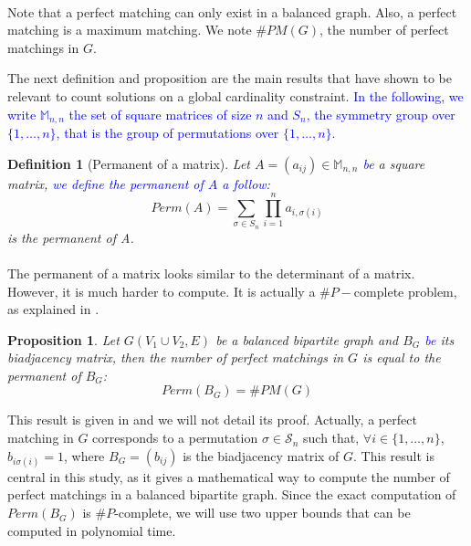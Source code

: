 \documentclass[jair,twoside,11pt,theapa]{article}
\newtheorem{proposition}[theorem]{Proposition}
\newtheorem{definition}[theorem]{Definition}
\newcommand{\minor}[1]{\textcolor{blue}{#1}}
\newcommand{\perm}[1]{Perm(#1)}
\newcommand{\nbperfectmatching}[1]{\#PM(#1)}
\begin{document}
\paragraph{}
Note that a perfect matching can only exist in a balanced graph. Also, a perfect matching is a maximum matching. We note $\#PM(G)$, the number of perfect matchings in $G$.

The next definition and proposition are the main results that \cite{PesantQZ12} have shown to be relevant to count solutions on a global cardinality constraint. \minor{In the following, we write $\mathbb{M}_{n,n}$ the set of square matrices of size $n$ and $S_n$, the symmetry group over $\lbrace 1, \ldots, n \rbrace$, that is the group of permutations over $\lbrace 1, \ldots, n \rbrace$}.

\begin{definition}[Permanent of a matrix%
]
	Let $A=(a_{ij}) \in \mathbb{M}_{n,n}$ \minor{be} a square matrix, \minor{we define the permanent of $A$ a follow:}
	\begin{equation}
		\perm{A} = \underset{\sigma \in S_n}{\sum}\prod_{i=1}^n a_{i,\sigma(i)}
	\end{equation}
	is the permanent of A.
\end{definition}

\paragraph{}
The permanent of a matrix looks similar to the determinant of a matrix. However, it is much harder to compute. It is actually a $\#P-$complete problem, as explained in \cite{Valiant79}.

\begin{proposition}%
	Let $G(V_1 \cup V_2, E)$ be a balanced bipartite graph and $B_G$ \minor{be} its biadjacency matrix, then the number of perfect matchings in $G$ is equal to the permanent of $B_G$:
	\begin{equation}
		\perm{B_G}=\nbperfectmatching{G}
	\end{equation}
\end{proposition}
This result is given in \cite{MT09} and we will not detail its proof. Actually, a perfect matching in $G$ corresponds to a permutation $\sigma \in \mathcal{S}_n$ such that, $\forall i \in \lbrace 1, \ldots, n \rbrace$, $b_{i\sigma(i)} = 1$, where $B_G = (b_{ij})$ is the biadjacency matrix of $G$. This result is central in this study, as it gives a mathematical way to compute the number of perfect matchings in a balanced bipartite graph. Since the exact computation of $\perm{B_G}$ is $\#P$-complete, we will use two  upper bounds that can be computed in polynomial time.
	
\end{document}
